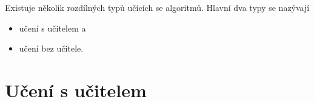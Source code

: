 \par{Existuje několik rozdílných typů učících se algoritmů. Hlavní dva typy se nazývají
\begin{itemize}
	\item učení s učitelem a
	\item učení bez učitele.
\end{itemize}}
\newpage
















\section{Učení s učitelem}
\label{sec:UvodUceniSUcitelem}

